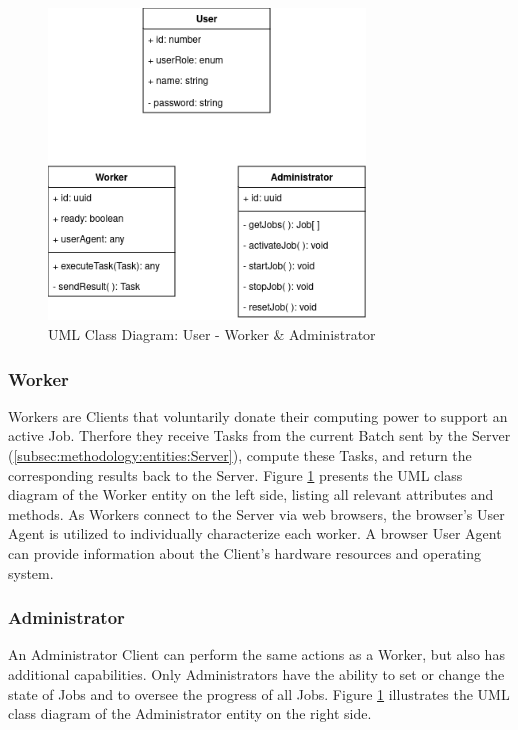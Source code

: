 \begin{figure}[htbp]
  \centering
  \includegraphics[width=0.75\textwidth]{gfx/figures/Client.png}
  \caption{\ac{UML} Class Diagram: User - Worker \& Administrator}
  \label{fig:methodology:client}
\end{figure}

\subsubsection{Worker}
\label{ssubsec:methodology:entities:client:worker}
Workers are Clients that voluntarily donate their computing power to support an active Job. Therfore they receive Tasks from the current Batch sent by the Server (\ref{subsec:methodology:entities:Server}), compute these Tasks, and return the corresponding results back to the Server. Figure \ref{fig:methodology:client} presents the \ac{UML} class diagram of the Worker entity on the left side, listing all relevant attributes and methods. As Workers connect to the Server via web browsers, the browser's User Agent is utilized to individually characterize each worker. A browser User Agent can provide information about the Client's hardware resources and operating system.

\subsubsection{Administrator}
\label{ssubsec:methodology:entities:client:admin}
An Administrator Client can perform the same actions as a Worker, but also has additional capabilities. Only Administrators have the ability to set or change the state of Jobs and to oversee the progress of all Jobs. Figure \ref{fig:methodology:client} illustrates the \ac{UML} class diagram of the Administrator entity on the right side.

